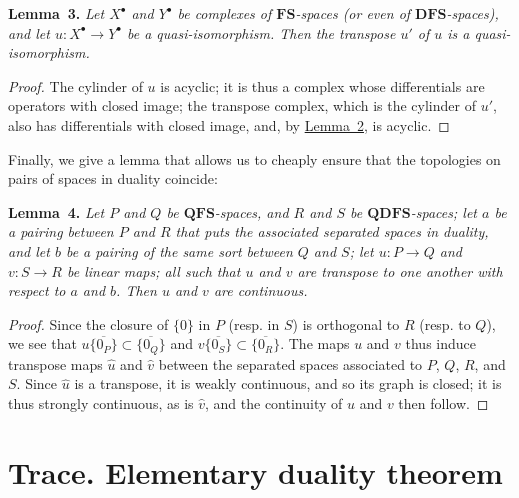 \documentclass[british]{article}
\newenvironment{itenv}[1]
  {\phantomsection\par\smallskip\noindent\textbf{#1.}\itshape}
  {\par\smallskip}
\begin{document}
\protect{}\label{lemma-3}
\begin{itenv}{Lemma 3}
Let \(X^\bullet\) and \(Y^\bullet\) be complexes of
\(\mathbf{FS}\)-spaces (or even of \(\mathbf{DFS}\)-spaces), and let
\(u\colon X^\bullet\to Y^\bullet\) be a quasi-isomorphism. Then the
transpose \(u'\) of \(u\) is a quasi-isomorphism.

\end{itenv}

\begin{proof}
The cylinder of \(u\) is acyclic; it is thus a complex whose
differentials are operators with closed image; the transpose complex,
which is the cylinder of \(u'\), also has differentials with closed
image, and, by \hyperref[lemma-2]{Lemma~2}, is acyclic.
\end{proof}

Finally, we give a lemma that allows us to cheaply ensure that the
topologies on pairs of spaces in duality coincide:

\protect{}\label{lemma-4}
\begin{itenv}{Lemma 4}
Let \(P\) and \(Q\) be \(\mathbf{QFS}\)-spaces, and \(R\) and \(S\) be
\(\mathbf{QDFS}\)-spaces; let \(a\) be a pairing between \(P\) and \(R\)
that puts the associated separated spaces in duality, and let \(b\) be a
pairing of the same sort between \(Q\) and \(S\); let \(u\colon P\to Q\)
and \(v\colon S\to R\) be linear maps; all such that \(u\) and \(v\) are
transpose to one another with respect to \(a\) and \(b\). Then \(u\) and
\(v\) are continuous.

\end{itenv}

\begin{proof}
Since the closure of \(\{0\}\) in \(P\) (resp. in \(S\)) is orthogonal
to \(R\) (resp. to \(Q\)), we see that
\(u\overline{\{0_P\}}\subset\overline{\{0_Q\}}\) and
\(v\overline{\{0_S\}}\subset\overline{\{0_R\}}\). The maps \(u\) and
\(v\) thus induce transpose maps \(\hat{u}\) and \(\hat{v}\) between the
separated spaces associated to \(P\), \(Q\), \(R\), and \(S\). Since
\(\hat{u}\) is a transpose, it is weakly continuous, and so its graph is
closed; it is thus strongly continuous, as is \(\hat{v}\), and the
continuity of \(u\) and \(v\) then follow.
\end{proof}

\section{Trace. Elementary duality theorem}\label{section-2}
\end{document}
